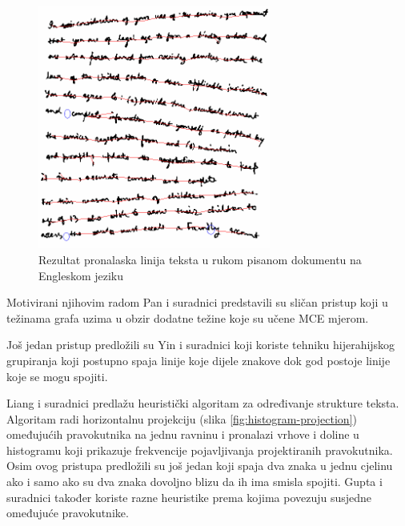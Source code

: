 \documentclass[times, utf8, zavrsni]{fer}
\begin{document}
\begin{figure}[htb]
    \centering
    \captionsetup{justification=centering,margin=2cm}
    \includegraphics[height=8cm]{images/mst-example-01.png}
    \caption{Rezultat pronalaska linija teksta u rukom pisanom dokumentu na Engleskom jeziku \citep{yin2007handwritten}}
    \label{fig:mst-example-01}
\end{figure}

Motivirani njihovim radom Pan i suradnici \citep{pan2011hybrid} predstavili su sličan pristup
koji u težinama grafa uzima u obzir dodatne težine koje su učene MCE  mjerom.

Još jedan pristup predložili su Yin i suradnici \citep{DBLP:journals/corr/abs-1301-2628} koji koriste
tehniku hijerahijskog grupiranja koji postupno spaja linije koje dijele znakove dok god
postoje linije koje se mogu spojiti. \citep{DBLP:journals/corr/TianPHLYT16}

Liang i suradnici \citep{liang1996document} predlažu heuristički algoritam za određivanje strukture
teksta. Algoritam radi horizontalnu projekciju (slika \ref{fig:histogram-projection}) omeđujućih pravokutnika na jednu ravninu i pronalazi
vrhove i doline u histogramu koji prikazuje frekvencije pojavljivanja projektiranih pravokutnika.
Osim ovog pristupa predložili su još jedan koji spaja dva znaka u jednu cjelinu ako i samo ako
su dva znaka dovoljno blizu da ih ima smisla spojiti. Gupta i suradnici \citep{gupta2006document} također koriste razne heuristike prema kojima
povezuju susjedne omeđujuće pravokutnike.

\pagebreak
\end{document}
